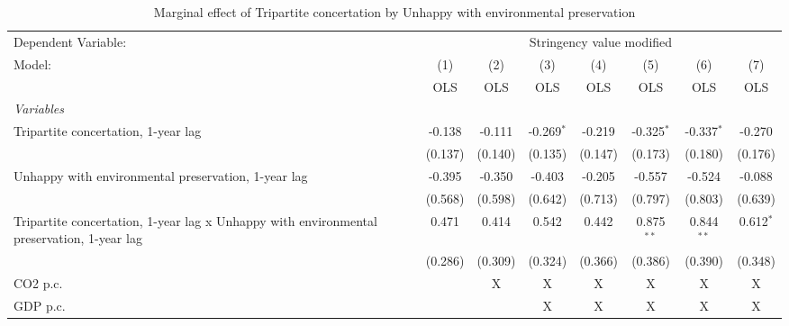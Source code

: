 
\begin{table}[htbp]
   \caption{Marginal effect of Tripartite concertation by Unhappy with environmental preservation}
   \centering
   \begin{tabular}{lccccccc}
      \toprule
      Dependent Variable: & \multicolumn{7}{c}{Stringency value modified}\\
      Model:                                                                                    & (1)     & (2)     & (3)          & (4)     & (5)          & (6)          & (7)\\  
                                                                                                &  OLS    & OLS     & OLS          & OLS     & OLS          & OLS          & OLS\\  
      \midrule
      \emph{Variables}\\
      Tripartite concertation, 1-year lag                                                       & -0.138  & -0.111  & -0.269$^{*}$ & -0.219  & -0.325$^{*}$ & -0.337$^{*}$ & -0.270\\   
                                                                                                & (0.137) & (0.140) & (0.135)      & (0.147) & (0.173)      & (0.180)      & (0.176)\\   
      Unhappy with environmental preservation, 1-year lag                                       & -0.395  & -0.350  & -0.403       & -0.205  & -0.557       & -0.524       & -0.088\\   
                                                                                                & (0.568) & (0.598) & (0.642)      & (0.713) & (0.797)      & (0.803)      & (0.639)\\   
      Tripartite concertation, 1-year lag x Unhappy with environmental preservation, 1-year lag & 0.471   & 0.414   & 0.542        & 0.442   & 0.875$^{**}$ & 0.844$^{**}$ & 0.612$^{*}$\\   
                                                                                                & (0.286) & (0.309) & (0.324)      & (0.366) & (0.386)      & (0.390)      & (0.348)\\   
      CO2 p.c.                                                                                  &         & X       & X            & X       & X            & X            & X\\  
      GDP p.c.                                                                                  &         &         & X            & X       & X            & X            & X\\  

\end{tabular}
\end{table}

